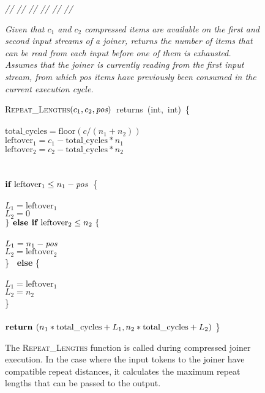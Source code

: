 \begin{figure}[t]
\begin{minipage}{0.1in}
\vspace{-1.75pt}
{\it // // // // // //}
\end{minipage}
\begin{minipage}{3.23in}
{\it Given that $c_1$ and $c_2$ compressed items are available on the
  first and second input streams of a joiner, returns the number of
  items that can be read from each input before one of them is
  exhausted.  Assumes that the joiner is currently reading from the
  first input stream, from which \mbox{pos} items have previously been
  consumed in the current execution cycle.}
\end{minipage}
\textsc{Repeat\_Lengths}$(c_1, c_2, \mbox{\it pos} )$~returns~(int,~int)~\{\\
\\
\tab$\mbox{total\_cycles} = \mbox{floor}(c/(n_1 + n_2))$\\
\tab$\mbox{leftover}_1 = c_1 - \mbox{total\_cycles} * n_1$\\
\tab$\mbox{leftover}_2 = c_2 - \mbox{total\_cycles} * n_2$\\
~ \vspace{-6pt}\\
\\
\tab$\mbox{\bf if~} \mbox{leftover}_1 \leq n_1 - \mbox{\it pos}$~\{\\
\tab{}\\
\tab\tab$L_1 = \mbox{leftover}_1$\\
\tab\tab$L_2 = 0$\\
\tab$\} \mbox{\bf~else if~} \mbox{leftover}_2 \leq n_2~\{$\\
\tab{}\\
\tab\tab$L_1 = n_1-\mbox{\it pos}$\\
\tab\tab$L_2 = \mbox{leftover}_2$\\
\tab\} \mbox{\bf ~else} \{\\
\tab{}\\
\tab\tab$L_1 = \mbox{leftover}_1$\\
\tab\tab$L_2 = n_2$\\
\tab\}\\
~ \vspace{-6pt}\\ 
\tab$\mbox{\bf return~}(n_1*\mbox{total\_cycles} + L_1, n_2*\mbox{total\_cycles} + L_2)$
\}
\caption{The \textsc{Repeat\_Lengths} function is called during
  compressed joiner execution.  In the case where the input tokens to
  the joiner have compatible repeat distances, it calculates the
  maximum repeat lengths that can be passed to the
  output.\protect\label{fig:repeat-lengths}}
\vspace{-2pt}
\end{figure}

